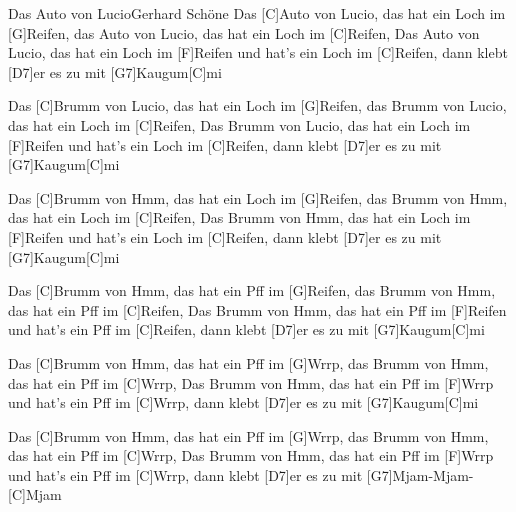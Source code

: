 \documentclass[../main.tex]{subfiles}
\begin{document}
\begin{songwithoutpagebreak}{Das Auto von Lucio}{Gerhard Schöne}{}
Das [C]Auto von Lucio, das hat ein Loch im [G]Reifen, das Auto von Lucio, das hat ein Loch im [C]Reifen,
Das Auto von Lucio, das hat ein Loch im [F]Reifen und hat's ein Loch im [C]Reifen,
dann klebt [D7]er es zu mit [G7]Kaugum[C]mi

Das [C]Brumm von Lucio, das hat ein Loch im [G]Reifen, das Brumm von Lucio, das hat ein Loch im [C]Reifen,
Das Brumm von Lucio, das hat ein Loch im [F]Reifen und hat's ein Loch im [C]Reifen,
dann klebt [D7]er es zu mit [G7]Kaugum[C]mi

Das [C]Brumm von Hmm, das hat ein Loch im [G]Reifen, das Brumm von Hmm, das hat ein Loch im [C]Reifen,
Das Brumm von Hmm, das hat ein Loch im [F]Reifen und hat's ein Loch im [C]Reifen,
dann klebt [D7]er es zu mit [G7]Kaugum[C]mi

Das [C]Brumm von Hmm, das hat ein Pff im [G]Reifen, das Brumm von Hmm, das hat ein Pff im [C]Reifen,
Das Brumm von Hmm, das hat ein Pff im [F]Reifen und hat's ein Pff im [C]Reifen,
dann klebt [D7]er es zu mit [G7]Kaugum[C]mi

Das [C]Brumm von Hmm, das hat ein Pff im [G]Wrrp, das Brumm von Hmm, das hat ein Pff im [C]Wrrp,
Das Brumm von Hmm, das hat ein Pff im [F]Wrrp und hat's ein Pff im [C]Wrrp,
dann klebt [D7]er es zu mit [G7]Kaugum[C]mi

Das [C]Brumm von Hmm, das hat ein Pff im [G]Wrrp, das Brumm von Hmm, das hat ein Pff im [C]Wrrp,
Das Brumm von Hmm, das hat ein Pff im [F]Wrrp und hat's ein Pff im [C]Wrrp,
dann klebt [D7]er es zu mit [G7]Mjam-Mjam-[C]Mjam
\end{songwithoutpagebreak}
\end{document}
